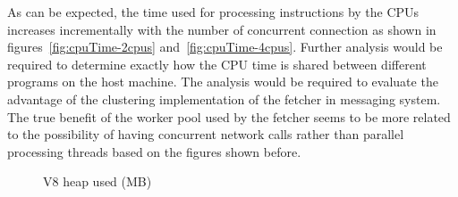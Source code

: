 \noindent
As can be expected, the time used for processing instructions by the CPUs increases incrementally with the number of concurrent connection as shown in figures~\ref{fig:cpuTime-2cpus} and~\ref{fig:cpuTime-4cpus}. Further analysis would be required to determine exactly how the CPU time is shared between different programs on the host machine. The analysis would be required to evaluate the advantage of the clustering implementation of the fetcher in messaging system. The true benefit of the worker pool used by the fetcher seems to be more related to the possibility of having concurrent network calls rather than parallel processing threads based on the figures shown before.
\newpage
\begin{figure}[h!]
	\centering
	 \hfill
	\caption{V8 heap used (MB)}
\end{figure}

